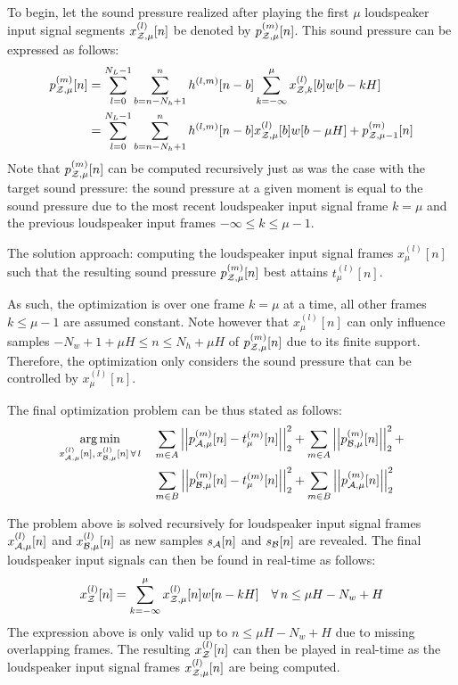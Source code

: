 To begin, let the sound pressure realized after playing the first $\mu$ loudspeaker input signal segments $x^{(l)}_{\mathcal{Z},\mu}[n]$ be denoted by $p_{\mathcal{Z},\mu}^{(m)}[n]$.
This sound pressure can be expressed as follows:
\begin{align}
    p_{\mathcal{Z},\mu}^{(m)}[n] &= \sum_{l=0}^{N_L - 1} \sum_{b = n - N_h + 1}^{n} h^{(l,m)}[n - b] \sum_{k=-\infty}^{\mu} x^{(l)}_{\mathcal{Z},k}[b] w[b - kH] \\
                   &= \sum_{l=0}^{N_L - 1} \sum_{b = n - N_h + 1}^{n} h^{(l,m)}[n - b]  x^{(l)}_{\mathcal{Z},\mu}[b]w[b - \mu H] + p_{\mathcal{Z},\mu-1}^{(m)}[n]
\end{align}
Note that $p_{\mathcal{Z},\mu}^{(m)}[n]$ can be computed recursively just as was the case with the target sound pressure:
the sound pressure at a given moment is equal to the sound pressure due to the most recent loudspeaker input signal frame $k = \mu$ and the previous loudspeaker input frames $-\infty \leq k \leq \mu - 1$.

The solution approach: computing the loudspeaker input signal frames $x_\mu^{(l)}[n]$ such that the resulting sound pressure $p_{\mathcal{Z},\mu}^{(m)}[n]$ best attains $t_\mu^{(l)}[n]$.

As such, the optimization is over one frame $k = \mu$ at a time, all other frames $k \leq \mu - 1$ are assumed constant. 
Note however that $x_\mu^{(l)}[n]$ can only influence samples $-N_w + 1 + \mu H  \leq n \leq N_h + \mu H$ of 
$p_{\mathcal{Z},\mu}^{(m)}[n]$ due to its finite support.
Therefore, the optimization only considers the sound pressure that can be controlled by $x_\mu^{(l)}[n]$.

The final optimization problem can be thus stated as follows:
\begin{align}
    \argmin{x_{\za,\mu}^{(l)}[n],\,x_{\zb,\mu}^{(l)}[n]\,\forall\,l}{
       &\sum_{m\in A} \norm[2][2]{p_{\za,\mu}^{(m)}[n] - t_\mu^{(m)}[n]} +
        \sum_{m\in A} \norm[2][2]{p_{\zb,\mu}^{(m)}[n]} + \\
       &\sum_{m\in B} \norm[2][2]{p_{\zb,\mu}^{(m)}[n] - t_\mu^{(m)}[n]} + 
        \sum_{m\in B} \norm[2][2]{p_{\za,\mu}^{(m)}[n]}
    }
\end{align}

The problem above is solved recursively for loudspeaker input signal frames $x_{\mathcal{A},\mu}^{(l)}[n]$ and $x_{\mathcal{B},\mu}^{(l)}[n]$ as new samples $s_{\mathcal{A}}[n]$ and $s_{\mathcal{B}}[n]$ are revealed.
The final loudspeaker input signals can then be found in real-time as follows: 
\begin{equation}
    x^{(l)}_{\mathcal{Z}}[n] = \sum_{k=-\infty}^{\mu} x^{(l)}_{\mathcal{Z},\mu}[n] w[n - kH]\quad \forall\,n \leq \mu H - N_w + H
\end{equation}
The expression above is only valid up to $n \leq \mu H - N_w + H$ due to missing overlapping frames.
The resulting $x^{(l)}_{\mathcal{Z}}[n]$ can then be played in real-time as the loudspeaker input signal frames $x^{(l)}_{\mathcal{Z},\mu}[n]$ are being computed.
